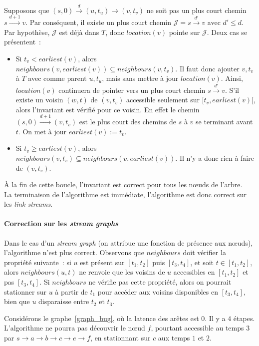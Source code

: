 \documentclass[12pt,a4paper]{article}
\begin{document}
Supposons que \((s, 0) \xrightarrow{d} (u, t_u) \rightarrow (v, t_v)\)
ne soit pas un plus court chemin \(s \xrightarrow{d+1} v\). Par
conséquent, il existe un plus court chemin
\(\mathcal{J} = s \xrightarrow{d'} v\) avec \(d' \leq d\). Par
hypothèse, \(\mathcal{J}\) est déjà dans \(T\), donc \(location(v)\)
pointe sur \(\mathcal{J}\). Deux cas se présentent~:
\begin{itemize}
\item Si \(t_v < earliest(v)\), alors
  \(neighbours(v, earliest(v)) \subseteq neighbours(v, t_v)\). Il faut
  donc ajouter \(v, t_v\) à \(T\) avec comme parent \(u, t_u\), mais
  sans mettre à jour \(location(v)\). Ainsi, \(location(v)\)
  continuera de pointer vers un plus court chemin
  \(s \xrightarrow{d'} v\). S'il existe un voisin \((w, t)\) de
  \((v, t_v)\) accessible seulement sur \([t_v, earliest(v)[\), alors
  l'invariant est vérifié pour ce voisin. En effet le chemin
  \((s, 0) \xrightarrow{d+1} (v, t_v)\) est le plus court des chemins
  de \(s\) à \(v\) se terminant avant \(t\). On met à jour
  \(earliest(v) := t_v\).
\item Si \(t_v \geq earliest(v)\), alors \(neighbours(v, t_v)
  \subseteq neighbours(v, earliest(v))\). Il n'y a donc rien à faire
  de \((v, t_v)\).
\end{itemize}
À la fin de cette boucle, l'invariant est correct pour tous les nœuds
de l'arbre.\\

La terminaison de l'algorithme est immédiate, l'algorithme est donc
correct sur les \textit{link streams}.

\paragraph{Correction sur les \textit{stream graphs}} Dans le cas d'un
\textit{stream graph} (on attribue une fonction de présence aux
nœuds), l'algorithme n'est plus correct. Observons que \(neighbours\)
doit vérifier la propriété suivante~: si \(u\) est présent sur
\([t_1, t_2]\) puis \([t_3, t_4]\), et soit \(t \in [t_1, t_2]\),
alors \(neighbours(u, t)\) ne renvoie que les voisins de \(u\)
accessibles en \([t_1, t_2]\) et pas \([t_3, t_4]\). Si \(neighbours\)
ne vérifie pas cette propriété, alors on pourrait stationner sur \(u\)
à partir de \(t_1\) pour accéder aux voisins disponibles en
\([t_3, t_4]\), bien que \(u\) disparaisse entre \(t_2\) et \(t_3\).

Considérons le graphe~\ref{graph_bug}, où la latence des arêtes est
\(0\). Il y a \(4\) étapes. L'algorithme ne pourra pas découvrir le
nœud \(f\), pourtant accessible au temps 3 par
\(s \rightarrow a \rightarrow b \rightarrow c \rightarrow e
\rightarrow f\), en stationnant sur \(c\) aux temps \(1\) et \(2\).
\end{document}
